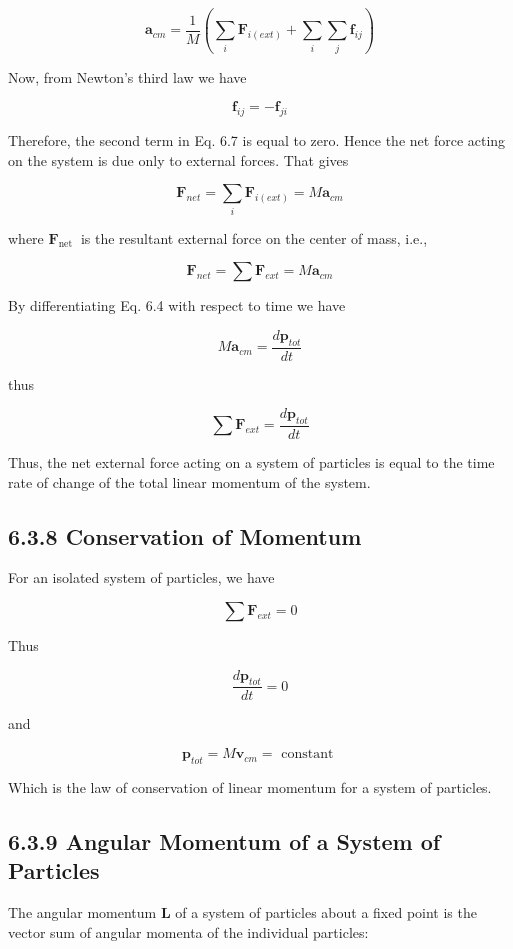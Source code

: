 \documentclass[10pt]{article}
\begin{document}
\begin{equation*}
\mathbf{a}_{c m}=\frac{1}{M}\left(\sum_{i} \mathbf{F}_{i(e x t)}+\sum_{i} \sum_{j} \mathbf{f}_{i j}\right) \tag{6.7}
\end{equation*}


Now, from Newton's third law we have

$$
\mathbf{f}_{i j}=-\mathbf{f}_{j i}
$$

Therefore, the second term in Eq. 6.7 is equal to zero. Hence the net force acting on the system is due only to external forces. That gives

$$
\mathbf{F}_{n e t}=\sum_{i} \mathbf{F}_{i(e x t)}=M \mathbf{a}_{c m}
$$

where $\mathbf{F}_{\text {net }}$ is the resultant external force on the center of mass, i.e.,

$$
\mathbf{F}_{n e t}=\sum \mathbf{F}_{e x t}=M \mathbf{a}_{c m}
$$

By differentiating Eq. 6.4 with respect to time we have

$$
M \mathbf{a}_{c m}=\frac{d \mathbf{p}_{t o t}}{d t}
$$

thus

$$
\sum \mathbf{F}_{e x t}=\frac{d \mathbf{p}_{t o t}}{d t}
$$

Thus, the net external force acting on a system of particles is equal to the time rate of change of the total linear momentum of the system.

\subsection*{6.3.8 Conservation of Momentum}
For an isolated system of particles, we have

$$
\sum \mathbf{F}_{e x t}=0
$$

Thus

$$
\frac{d \mathbf{p}_{t o t}}{d t}=0
$$

and

$$
\mathbf{p}_{t o t}=M \mathbf{v}_{c m}=\text { constant }
$$

Which is the law of conservation of linear momentum for a system of particles.

\subsection*{6.3.9 Angular Momentum of a System of Particles}
The angular momentum $\mathbf{L}$ of a system of particles about a fixed point is the vector sum of angular momenta of the individual particles:
\end{document}
